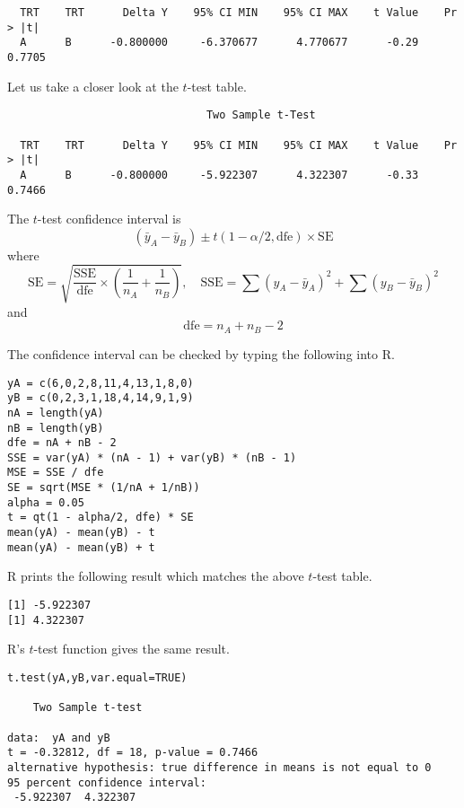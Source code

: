 \documentclass[12pt]{article}
\begin{document}
{\scriptsize\begin{verbatim}
  TRT    TRT      Delta Y    95% CI MIN    95% CI MAX    t Value    Pr > |t|  
  A      B      -0.800000     -6.370677      4.770677      -0.29      0.7705  
\end{verbatim}}

\newpage

Let us take a closer look at the $t$-test table.

{\scriptsize\begin{verbatim}
                               Two Sample t-Test

  TRT    TRT      Delta Y    95% CI MIN    95% CI MAX    t Value    Pr > |t|  
  A      B      -0.800000     -5.922307      4.322307      -0.33      0.7466  
\end{verbatim}}

The $t$-test confidence interval is
\begin{equation*}
(\bar y_A-\bar y_B)\pm t(1-\alpha/2,\text{dfe})\times\text{SE}
\end{equation*}
where
\begin{equation*}
\text{SE}=\sqrt{\frac{\text{SSE}}{\text{dfe}}\times\left(\frac{1}{n_A}+\frac{1}{n_B}\right)},
\quad
\text{SSE}=\sum(y_A-\bar y_A)^2+\sum(y_B-\bar y_B)^2
\end{equation*}
and
\begin{equation*}
\text{dfe}=n_A+n_B-2
\end{equation*}

The confidence interval can be checked by typing the following into R.

{\scriptsize\begin{verbatim}
yA = c(6,0,2,8,11,4,13,1,8,0)
yB = c(0,2,3,1,18,4,14,9,1,9)
nA = length(yA)
nB = length(yB)
dfe = nA + nB - 2
SSE = var(yA) * (nA - 1) + var(yB) * (nB - 1)
MSE = SSE / dfe
SE = sqrt(MSE * (1/nA + 1/nB))
alpha = 0.05
t = qt(1 - alpha/2, dfe) * SE
mean(yA) - mean(yB) - t
mean(yA) - mean(yB) + t
\end{verbatim}}

R prints the following result which matches the above $t$-test table.

{\scriptsize\begin{verbatim}
[1] -5.922307
[1] 4.322307
\end{verbatim}}

R's $t$-test function gives the same result.

{\scriptsize\begin{verbatim}
t.test(yA,yB,var.equal=TRUE)

	Two Sample t-test

data:  yA and yB
t = -0.32812, df = 18, p-value = 0.7466
alternative hypothesis: true difference in means is not equal to 0
95 percent confidence interval:
 -5.922307  4.322307
\end{verbatim}}
\end{document}

